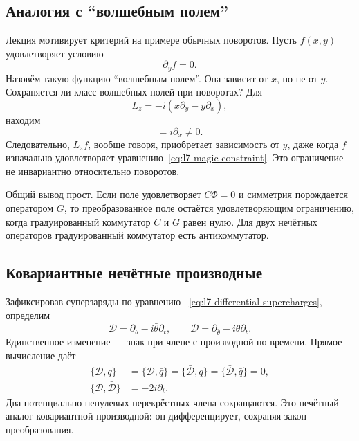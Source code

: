\subsection{Аналогия с ``волшебным полем''}

Лекция мотивирует критерий на примере обычных поворотов. Пусть \(f(x,y)\) удовлетворяет условию
\begin{equation}
\partial_y f=0.
\label{eq:l7-magic-constraint}
\end{equation}
Назовём такую функцию ``волшебным полем''. Она зависит от \(x\), но не от \(y\). Сохраняется ли класс волшебных полей при поворотах? Для
\begin{equation}
L_z=-i\left(x\partial_y-y\partial_x\right),
\end{equation}
находим
\begin{equation}
[\partial_y,L_z]=i\partial_x\neq0.
\end{equation}
Следовательно, \(L_z f\), вообще говоря, приобретает зависимость от \(y\), даже когда \(f\) изначально удовлетворяет уравнению~\eqref{eq:l7-magic-constraint}. Это ограничение не инвариантно относительно поворотов.

Общий вывод прост. Если поле удовлетворяет \(C\Phi=0\) и симметрия порождается оператором \(G\), то преобразованное поле остаётся удовлетворяющим ограничению, когда градуированный коммутатор \(C\) и \(G\) равен нулю. Для двух нечётных операторов градуированный коммутатор есть антикоммутатор.

\begin{classroomqa}
\end{classroomqa}

\subsection{Ковариантные нечётные производные}

Зафиксировав суперзаряды по уравнению ~\eqref{eq:l7-differential-supercharges}, определим
\begin{equation}
\mathcal D=\partial_\theta-i\bar\theta\partial_t,
\qquad
\bar{\mathcal D}=\partial_{\bar\theta}-i\theta\partial_t.
\label{eq:l7-covariant-derivatives}
\end{equation}
Единственное изменение — знак при члене с производной по времени. Прямое вычисление даёт
\begin{align}
\{\mathcal D,q\}
&=\{\mathcal D,\bar q\}
=\{\bar{\mathcal D},q\}
=\{\bar{\mathcal D},\bar q\}=0,\\
\{\mathcal D,\bar{\mathcal D}\}&=-2i\partial_t.
\label{eq:l7-covariant-algebra}
\end{align}
Два потенциально ненулевых перекрёстных члена сокращаются. Это нечётный аналог ковариантной производной: он дифференцирует, сохраняя закон преобразования.

